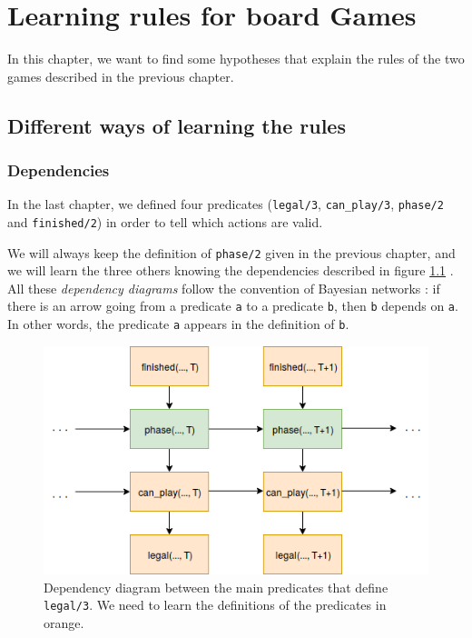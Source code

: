 

\chapter{Learning rules for board Games}

In this chapter, we want to find some hypotheses that explain the rules of the two games described in the previous chapter.

\section{Different ways of learning the rules}

\subsection{Dependencies}

In the last chapter, we defined four predicates (\texttt{legal/3}, \texttt{can\_play/3}, \texttt{phase/2} and \texttt{finished/2}) in order to tell which actions are valid.

\smallskip

We will always keep the definition of \texttt{phase/2} given in the previous chapter, and we will learn the three others knowing the dependencies described in figure \ref{fig:general_dependencies} . All these \textit{dependency diagrams} follow the convention of Bayesian networks \citep{pearl2014probabilistic}: if there is an arrow going from a predicate \texttt{a} to a predicate \texttt{b}, then \texttt{b} depends on \texttt{a}. In other words, the predicate \texttt{a} appears in the definition of \texttt{b}.

\begin{figure}[h]
\centering
\includegraphics[width = 0.7\hsize]{figures/general_dependancies.png}
\caption{Dependency diagram between the main predicates that define \texttt{legal/3}. We need to learn the definitions of the predicates in orange.}
\label{fig:general_dependencies}
\end{figure}

